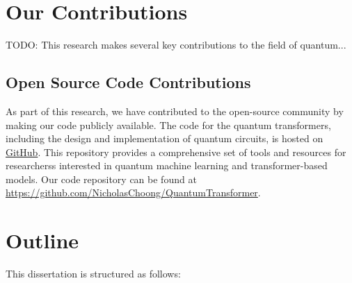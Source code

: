 \section{Our Contributions}
\label{sec:contributions}

TODO: This research makes several key contributions to the field of quantum...

\subsection{Open Source Code Contributions}
\label{subsec:open_source_code_contributions}

As part of this research, we have contributed to the
open-source community by making our code publicly available. The code
for the quantum transformers, including the design and implementation
of quantum circuits, is hosted on \href{https://github.com/}{GitHub}.
This repository provides a
comprehensive set of tools and resources for researcherss interested
in quantum machine learning and transformer-based models. Our code
repository can be found at
\url{https://github.com/NicholasChoong/QuantumTransformer}.

\section{Outline}
\label{sec:outline}

This dissertation is structured as follows:

